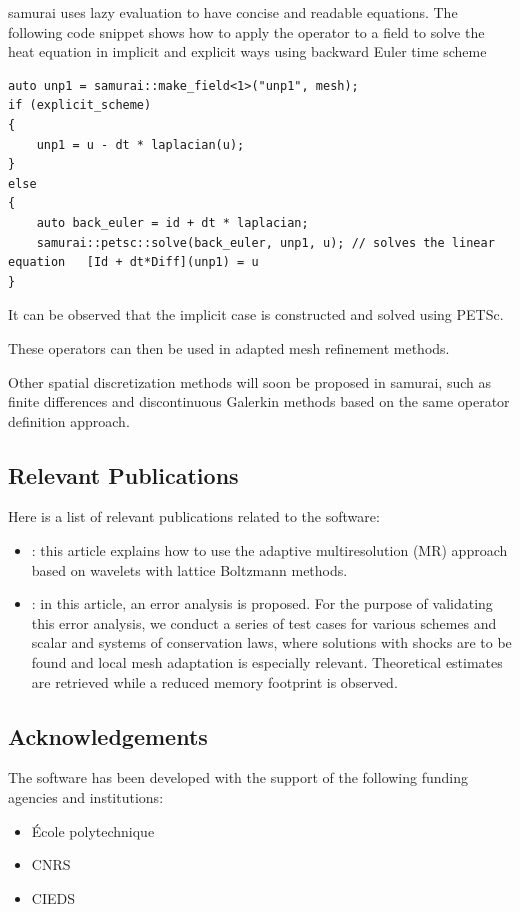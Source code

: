 samurai uses lazy evaluation to have concise and readable equations. The following code snippet shows how to apply the operator to a field to solve the heat equation in implicit and explicit ways using backward Euler time scheme

\begin{listing}[ht]
    \begin{verbatim}
auto unp1 = samurai::make_field<1>("unp1", mesh);
if (explicit_scheme)
{
    unp1 = u - dt * laplacian(u);
}
else
{
    auto back_euler = id + dt * laplacian;
    samurai::petsc::solve(back_euler, unp1, u); // solves the linear equation   [Id + dt*Diff](unp1) = u
}
\end{verbatim}
\end{listing}

It can be observed that the implicit case is constructed and solved using PETSc.

These operators can then be used in adapted mesh refinement methods.

Other spatial discretization methods will soon be proposed in samurai, such as finite differences and discontinuous Galerkin methods based on the same operator definition approach.

\subsection{Relevant Publications}
\label{sec:Samurai:publications}

Here is a list of relevant publications related to the software:

\begin{itemize}
    \item \cite{bellotti_multidimensional_2022}: this article explains how to use the adaptive multiresolution (MR) approach based on wavelets with lattice Boltzmann methods.
    \item \cite{bellotti_multiresolution-based_2022}: in this article, an error analysis is proposed. For the purpose of validating this error analysis, we conduct a series of test cases for various schemes and scalar and systems of conservation laws, where solutions with shocks are to be found and local mesh adaptation is especially relevant. Theoretical estimates are retrieved while a reduced memory footprint is observed.
\end{itemize}

\subsection{Acknowledgements}
\label{sec::Samurai:acknowledgements}

The software has been developed with the support of the following funding agencies and institutions:
\begin{itemize}
    \item \'Ecole polytechnique
    \item CNRS
    \item CIEDS
 \end{itemize}
